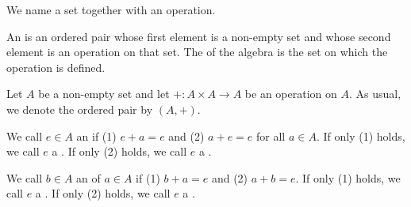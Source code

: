 
\sbasic





\sstart
{}


We name a set
together with an operation.



An  is
an ordered pair whose first
element is a non-empty set
and whose second element
is an operation on that set.
The
of the algebra is
the set on which the operation
is defined.


Let $A$ be a non-empty set and
let $+: A \times A \to A$ be
an operation on $A$.
As usual, we denote the ordered
pair by $(A, +)$.


We call $e \in A$ an 
if (1) $e + a = e$ and (2) $a + e = e$ for all $a \in A$.
If only (1) holds, we call $e$ a
.
If only (2) holds, we call $e$ a
.


We call $b \in A$ an 
of $a \in A$ if (1) $b + a = e$ and (2) $a + b = e$.
If only (1) holds, we call $e$ a
.
If only (2) holds, we call $e$ a
.

\strats
